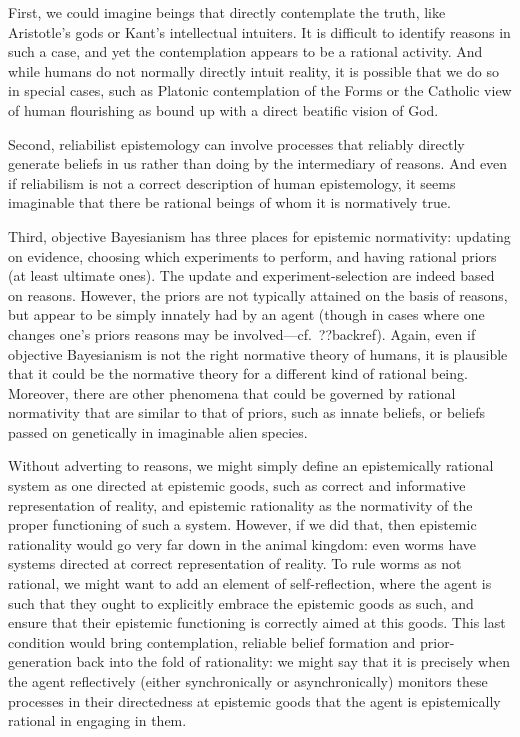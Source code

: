 First, we could imagine beings that directly contemplate the truth, like Aristotle's gods or Kant's intellectual
intuiters. It is difficult to identify reasons in such a case, and yet the contemplation appears to be a rational
activity. And while humans do not normally directly intuit reality, it is possible that we do so in special cases,
such as Platonic contemplation of the Forms or the Catholic view of human flourishing as bound up with a direct beatific
vision of God. 

Second, reliabilist epistemology can involve processes that reliably directly generate beliefs in us rather than 
doing by the intermediary of reasons. And even if reliabilism is not a correct description of human epistemology,
it seems imaginable that there be rational beings of whom it is normatively true.

Third, objective Bayesianism has three places for epistemic normativity: updating on evidence, choosing which 
experiments to perform, and having rational priors (at least ultimate ones). The update and experiment-selection are indeed based on 
reasons. However, the priors are not typically attained on the basis of reasons, but appear to be simply innately 
had by an agent (though in cases where one changes one's priors reasons may be involved---cf.\ ??backref). Again, even if objective 
Bayesianism is not the right normative theory of humans, it is plausible that it could be the normative theory for 
a different kind of rational being. Moreover, there are other phenomena that could be governed by rational 
normativity that are similar to that of priors, such as innate beliefs, or beliefs passed on genetically in 
imaginable alien species. 

Without adverting to reasons, we might simply define an epistemically rational system as one directed at 
epistemic goods, such as correct and informative representation of reality, and epistemic rationality as 
the normativity of the proper functioning of such a system. However, if we did that, then epistemic rationality
would go very far down in the animal kingdom: even worms have systems directed at correct representation of 
reality. To rule worms as not rational, we might want to add an element of self-reflection, where the agent 
is such that they ought to explicitly embrace the epistemic goods as such, and ensure that their epistemic 
functioning is correctly aimed at this goods. This last condition would bring contemplation, reliable
belief formation and prior-generation back into the fold of rationality: we might say that it is precisely 
when the agent reflectively (either synchronically or asynchronically) monitors these processes in their 
directedness at epistemic goods that the agent is epistemically rational in engaging in them. 


